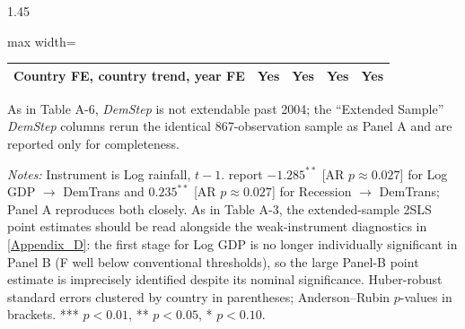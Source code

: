 \documentclass[12pt]{article}
\begin{document}
\begin{bibunit}[jpe]
\begin{spacing}{1.45}
\begin{table}[H]
\begin{adjustbox}{max width=\textwidth}
\begin{threeparttable}
\begin{tabular}{lcccc}
\midrule
Country FE, country trend, year FE & Yes & Yes & Yes & Yes \\
\bottomrule
\end{tabular}
\begin{tablenotes}[flushleft]
\footnotesize
\item[a] As in Table A-6, \textit{DemStep} is not extendable past 2004; the ``Extended Sample'' \textit{DemStep} columns rerun the identical 867-observation sample as Panel A and are reported only for completeness.
\item \textit{Notes:} Instrument is Log rainfall, $t-1$. \citet{bruckner2011rain} report $-1.285^{**}$ [AR $p\approx0.027$] for Log GDP $\to$ DemTrans and $0.235^{**}$ [AR $p\approx0.027$] for Recession $\to$ DemTrans; Panel A reproduces both closely. As in Table A-3, the extended-sample 2SLS point estimates should be read alongside the weak-instrument diagnostics in \ref{Appendix_D}: the first stage for Log GDP is no longer individually significant in Panel B (F well below conventional thresholds), so the large Panel-B point estimate is imprecisely identified despite its nominal significance. Huber-robust standard errors clustered by country in parentheses; Anderson--Rubin $p$-values in brackets. *** $p<0.01$, ** $p<0.05$, * $p<0.10$.
\end{tablenotes}
\end{threeparttable}
\end{adjustbox}
\end{table}


\end{spacing}
\end{bibunit}
\end{document}

